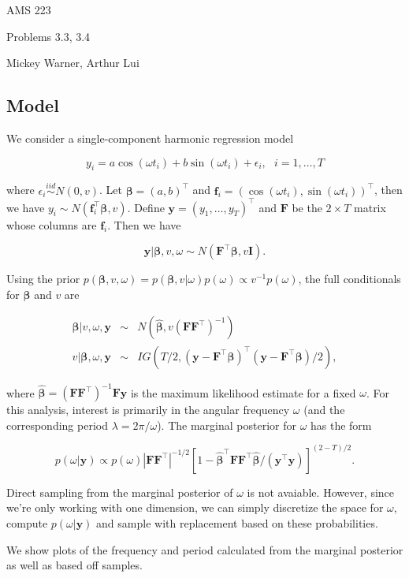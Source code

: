 \documentclass[12pt]{article}
\newcommand{\m}[1]{\mathbf{\bm{#1}}}
\begin{document}
\noindent AMS 223

\noindent Problems 3.3, 3.4

\noindent Mickey Warner, Arthur Lui

\subsection*{Model}

\noindent We consider a single-component harmonic regression model

\[ y_i = a\cos(\omega t_i) + b\sin(\omega t_i) +\epsilon_i,~~~i=1,\ldots,T \]

\noindent where $\epsilon_i\overset{iid}{\sim}N(0,v)$. Let $\m{\beta}=(a,b)^\top$ and $\m{f}_i=(\cos(\omega t_i), \sin(\omega t_i))^\top$, then we have $y_i\sim N(\m{f}_i^\top \m{\beta}, v)$. Define $\m{y}=(y_1,\ldots,y_T)^\top$ and $\m{F}$ be the $2\times T$ matrix whose columns are $\m{f}_i$. Then we have

\[ \m{y}|\m{\beta},v,\omega \sim N\left(\m{F}^\top \m{\beta}, v\m{I}\right). \]

\noindent Using the prior $p(\m{\beta},v,\omega)=p(\m{\beta},v|\omega)p(\omega) \propto v^{-1}p(\omega)$, the full conditionals for $\m{\beta}$ and $v$ are

\begin{eqnarray*}
\m{\beta}|v,\omega,\m{y} &\sim& N\left(\hat{\m{\beta}}, v(\m{F}\m{F}^\top)^{-1}\right)  \\
v|\m{\beta},\omega,\m{y} &\sim& IG\left(T/2, (\m{y}-\m{F}^\top\m{\beta})^\top(\m{y}-\m{F}^\top\m{\beta})/2\right),
\end{eqnarray*}

\noindent where $\hat{\m{\beta}}=(\m{F}\m{F}^\top)^{-1}\m{F}\m{y}$ is the maximum likelihood estimate for a fixed $\omega$. For this analysis, interest is primarily in the angular frequency $\omega$ (and the corresponding period $\lambda=2\pi/\omega$). The marginal posterior for $\omega$ has the form

\[ p(\omega|\m{y}) \propto p(\omega)\left|\m{F}\m{F}^\top\right|^{-1/2}\left[1-\hat{\m{\beta}}^\top\m{F}\m{F}^\top\hat{\m{\beta}}/(\m{y}^\top\m{y})\right]^{(2-T)/2}. \]

\noindent Direct sampling from the marginal posterior of $\omega$ is not avaiable. However, since we're only working with one dimension, we can simply discretize the space for $\omega$, compute $p(\omega|\m{y})$ and sample with replacement based on these probabilities.
\bigskip

\noindent We show plots of the frequency and period calculated from the marginal posterior as well as based off samples.
\end{document}
